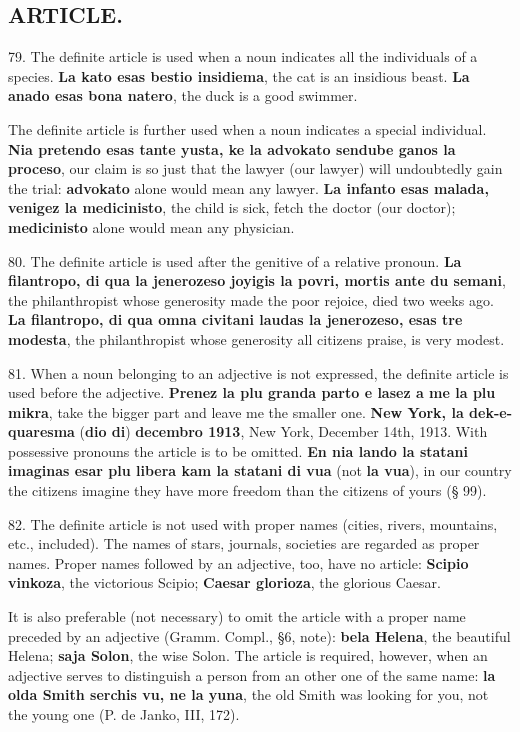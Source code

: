 \subsection*{ARTICLE.}
79. The definite article is used when a noun indicates all the individuals of a species. \textbf{La kato esas bestio insidiema}, the cat is an insidious beast. \textbf{La anado esas bona natero}, the duck is a good swimmer. 

The definite article is further used when a noun indicates a special individual. \textbf{Nia pretendo esas tante yusta, ke la advokato sendube ganos la proceso}, our claim is so just that the lawyer (our lawyer) will undoubtedly gain the trial: \textbf{advokato} alone would mean any lawyer. \textbf{La infanto esas malada, venigez la medicinisto}, the child is sick, fetch the doctor (our doctor); \textbf{medicinisto} alone would mean any physician. 

80. The definite article is used after the genitive of a relative pronoun. \textbf{La filantropo, di qua la jenerozeso joyigis la povri, mortis ante du semani}, the philanthropist whose generosity made the poor rejoice, died two weeks ago. \textbf{La filantropo, di qua omna civitani laudas la jenerozeso, esas tre modesta}, the philanthropist whose generosity all citizens praise, is very modest. 

81. When a noun belonging to an adjective is not expressed, the definite article is used before the adjective. \textbf{Prenez la plu granda parto e lasez a me la plu mikra}, take the bigger part and leave me the smaller one. \textbf{New York, la dek-e-quaresma} (\textbf{dio di}) \textbf{decembro 1913}, New York, December 14th, 1913. With possessive pronouns the article is to be omitted. \textbf{En nia lando la statani imaginas esar plu libera kam la statani di vua} (not \textbf{la vua}), in our country the citizens imagine they have more freedom than the citizens of yours (§ 99). 

82. The definite article is not used with proper names (cities, rivers, mountains, etc., included). The names of stars, journals, societies are regarded as proper names. Proper names followed by an adjective, too, have no article: \textbf{Scipio vinkoza}, the victorious Scipio; \textbf{Caesar glorioza}, the glorious Caesar. 

It is also preferable (not necessary) to omit the article with a proper name preceded by an adjective (Gramm. Compl., §6, note): \textbf{bela Helena}, the beautiful Helena; \textbf{saja Solon}, the wise Solon. The article is required, however, when an adjective serves to distinguish a person from an other one of the same name: \textbf{la olda Smith serchis vu, ne la yuna}, the old Smith was looking for you, not the young one (P. de Janko, III, 172). 

